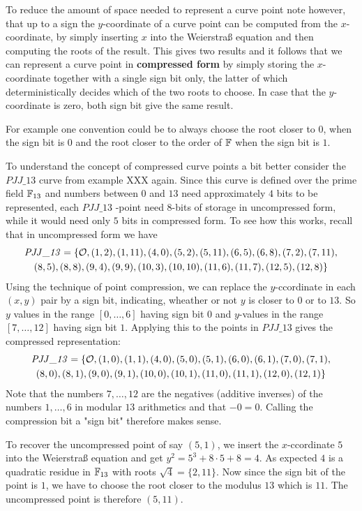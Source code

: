 To reduce the amount of space needed to represent a curve point note however, that up to a sign the $y$-coordinate of a curve point can be computed from the $x$-coordinate, by simply inserting $x$ into the Weierstraß equation and then computing the roots of the result. This gives two results and it follows that we can represent a curve point in \textbf{compressed form} by simply storing the $x$-coordinate together with a single sign bit only, the latter of which deterministically decides which of the two roots to choose. In case that the $y$-coordinate is zero, both sign bit give the same result.

For example one convention could be to always choose the root closer to $0$, when the sign bit is $0$ and the root closer to the order of $\mathbb{F}$ when the sign bit is $1$.

\begin{example} To understand the concept of compressed curve points a bit better consider the $\mathit{PJJ\_13}$ curve from example XXX again. Since this curve is defined over the prime field $\mathbb{F}_{13}$ and numbers between $0$ and $13$ need approximately $4$ bits to be represented, each $\mathit{PJJ\_13}$ -point need $8$-bits of storage in uncompressed form, while it would need only $5$ bits in compressed form. To see how this works, recall that in uncompressed form we have
\begin{multline*}
\mathit{PJJ\_13} = \{\mathcal{O}, (1, 2), (1, 11), (4, 0), (5, 2), (5, 11), (6, 5), (6, 8), (7,2), (7, 11), \\ (8, 5), (8, 8), (9, 4), (9, 9), (10, 3), (10,
10), (11, 6), (11, 7), (12, 5), (12, 8)\}
\end{multline*}
Using the technique of point compression, we can replace the $y$-ccordinate in each $(x,y)$ pair by a sign bit, indicating, wheather or not $y$ is closer to $0$ or to $13$. So $y$ values in the range $[0,\ldots,6]$ having sign bit $0$ and $y$-values in the range $[7,\ldots,12]$ having sign bit $1$. Applying this to the points in $\mathit{PJJ\_13}$ gives the compressed representation:
\begin{multline*}
\mathit{PJJ\_13} = \{\mathcal{O}, (1, 0), (1, 1), (4, 0), (5, 0), (5, 1), (6, 0), (6, 1), (7,0), (7, 1), \\ (8, 0), (8, 1), (9, 0), (9, 1), (10, 0), (10,1), (11, 0), (11, 1), (12, 0), (12, 1)\}
\end{multline*}
Note that the numbers $7,\ldots, 12$ are the negatives (additive inverses) of the numbers $1,\ldots, 6$ in modular $13$ arithmetics and that $-0=0$. Calling the compression bit a "sign bit" therefore makes sense.

To recover the uncompressed point of say $(5,1)$, we insert the $x$-ccordinate $5$ into the Weierstraß equation and get $y^2 = 5^3 + 8\cdot 5 +8 = 4$. As expected $4$ is a quadratic residue in $\mathbb{F}_{13}$ with roots $\sqrt{4}= \{2,11\}$. Now since the sign bit of the point is $1$, we have to choose the root closer to the modulus $13$ which is $11$. The uncompressed point is therefore $(5,11)$.
\end{example}
